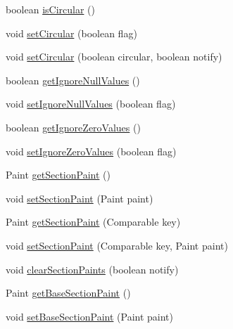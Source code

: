 \begin{DoxyCompactItemize}
\item 
boolean \mbox{\hyperlink{classorg_1_1jfree_1_1chart_1_1plot_1_1_pie_plot_aa2b4ed17a7951f9b1fa4ca48c78a259b}{is\+Circular}} ()
\item 
void \mbox{\hyperlink{classorg_1_1jfree_1_1chart_1_1plot_1_1_pie_plot_ad604c65dd48135bbdfe7472dac9c5198}{set\+Circular}} (boolean flag)
\item 
void \mbox{\hyperlink{classorg_1_1jfree_1_1chart_1_1plot_1_1_pie_plot_af99bccb2661acdecf5f3725f35b7dcb3}{set\+Circular}} (boolean circular, boolean notify)
\item 
boolean \mbox{\hyperlink{classorg_1_1jfree_1_1chart_1_1plot_1_1_pie_plot_ad2449fa76e41a198e1b8900d8277cbd5}{get\+Ignore\+Null\+Values}} ()
\item 
void \mbox{\hyperlink{classorg_1_1jfree_1_1chart_1_1plot_1_1_pie_plot_a618349ca4f4880ab09be7e6cb5e5c4af}{set\+Ignore\+Null\+Values}} (boolean flag)
\item 
boolean \mbox{\hyperlink{classorg_1_1jfree_1_1chart_1_1plot_1_1_pie_plot_a8406857ddf597ed96eee37a8bdb53ba1}{get\+Ignore\+Zero\+Values}} ()
\item 
void \mbox{\hyperlink{classorg_1_1jfree_1_1chart_1_1plot_1_1_pie_plot_a074921a8b902098b95d1be421c523f1b}{set\+Ignore\+Zero\+Values}} (boolean flag)
\item 
Paint \mbox{\hyperlink{classorg_1_1jfree_1_1chart_1_1plot_1_1_pie_plot_ad50a2ec9a9fb6fdf8992e8f64f57bd1d}{get\+Section\+Paint}} ()
\item 
void \mbox{\hyperlink{classorg_1_1jfree_1_1chart_1_1plot_1_1_pie_plot_a201122096ae318cb6e976a7a9596c500}{set\+Section\+Paint}} (Paint paint)
\item 
Paint \mbox{\hyperlink{classorg_1_1jfree_1_1chart_1_1plot_1_1_pie_plot_a3de4031e87303ad438571b42b698324b}{get\+Section\+Paint}} (Comparable key)
\item 
void \mbox{\hyperlink{classorg_1_1jfree_1_1chart_1_1plot_1_1_pie_plot_adee3362fbb406b556846f698e0ce628f}{set\+Section\+Paint}} (Comparable key, Paint paint)
\item 
void \mbox{\hyperlink{classorg_1_1jfree_1_1chart_1_1plot_1_1_pie_plot_a9de19ba543feb036b17986b5c654f8f8}{clear\+Section\+Paints}} (boolean notify)
\item 
Paint \mbox{\hyperlink{classorg_1_1jfree_1_1chart_1_1plot_1_1_pie_plot_a3f62bcd5bca8122fa099f9607f75d93a}{get\+Base\+Section\+Paint}} ()
\item 
void \mbox{\hyperlink{classorg_1_1jfree_1_1chart_1_1plot_1_1_pie_plot_a582a3691ba857599da8b77596e812a04}{set\+Base\+Section\+Paint}} (Paint paint)

\end{DoxyCompactItemize}
